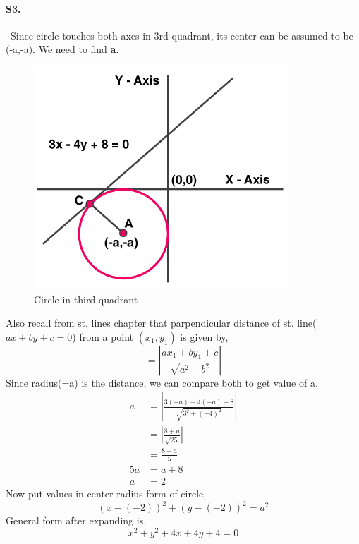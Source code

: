 \documentclass{article}
\begin{document}
\paragraph{S3.}\
Since circle touches both axes in 3rd quadrant, its center can be assumed to be (-a,-a).  We need to find \textbf{a}.
\begin{figure}[H]
    \centering
    \includegraphics[scale=0.5]{l4_ps1-3.png}
    \caption{Circle in third quadrant}
\end{figure}
Also recall from st. lines chapter that parpendicular distance of st. line($ax+by+c=0$) from a point $(x_1,y_1)$ is given by,
\begin{equation*}
    =\left|\frac{ax_1+by_1+c}{\sqrt{a^2+b^2}}\right|
\end{equation*} 
Since radius(=a) is the distance, we can compare both to get value of a.
\begin{align*}
    a&=\left|\frac{3(-a)-4(-a)+8}{\sqrt{3^2+(-4)^2}}\right|\\
    &=\left|\frac{8+a}{\sqrt{25}}\right|\\
    &=\frac{8+a}{5}\\
    5a&=a+8\\
    a&=2
\end{align*}
Now put values in center radius form of circle,
\begin{equation*}
    (x-(-2))^2+(y-(-2))^2=a^2
\end{equation*}
General form after expanding is,
\begin{equation*}
    x^2+y^2+4x+4y+4=0
\end{equation*}
\end{document}
